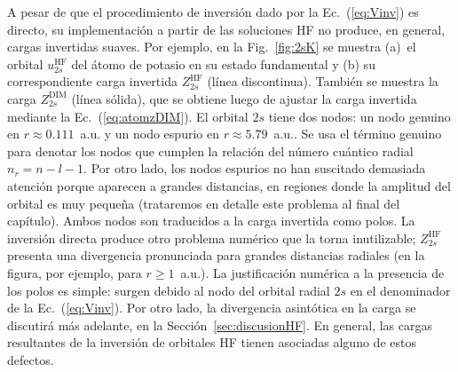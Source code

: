 A pesar de que el procedimiento de inversión dado por la 
Ec.~(\ref{eq:Vinv}) es directo, su implementación a partir de las 
soluciones HF no produce, en general, cargas invertidas suaves. Por 
ejemplo, en la Fig.~\ref{fig:2sK} se muestra (a)~el orbital 
$u_{2s}^{\mathrm{HF}}$ del átomo de potasio en su estado fundamental y 
(b) su correspondiente carga invertida $Z_{2s}^{\mathrm{HF}}$ (línea 
discontinua). También se muestra la carga $Z_{2s}^{\mathrm{DIM}}$ (línea 
sólida), que se obtiene luego de ajustar la carga invertida mediante la 
Ec.~(\ref{eq:atomzDIM}). El orbital $2s$ tiene dos nodos: un nodo 
genuino en $r\approx 0.111$~a.u. y un nodo espurio en 
\mbox{$r\approx 5.79$~a.u.}. Se usa el término genuino para denotar los 
nodos que cumplen la relación del número cuántico radial $n_r=n-l-1$. 
Por otro lado, los nodos espurios no han suscitado demasiada atención 
porque aparecen a grandes distancias, en regiones donde la amplitud del 
orbital es muy pequeña (trataremos en detalle este problema al final del 
capítulo). Ambos nodos son traducidos a la carga invertida como polos. 
La inversión directa produce otro problema numérico que la 
torna inutilizable; $Z_{2s}^{\mathrm{HF}}$ presenta una 
divergencia pronunciada para grandes distancias radiales (en la figura, 
por ejemplo, para $r\geq 1$~a.u.). 
La justificación numérica a la presencia de los polos es simple: surgen 
debido al nodo del orbital radial $2s$ en el denominador de la 
Ec.~(\ref{eq:Vinv}). Por otro lado, la divergencia asintótica en la 
carga se discutirá más adelante, en la Sección~\ref{sec:discusionHF}. 
En general, las cargas resultantes de la inversión de orbitales HF 
tienen asociadas alguno de estos defectos. 

